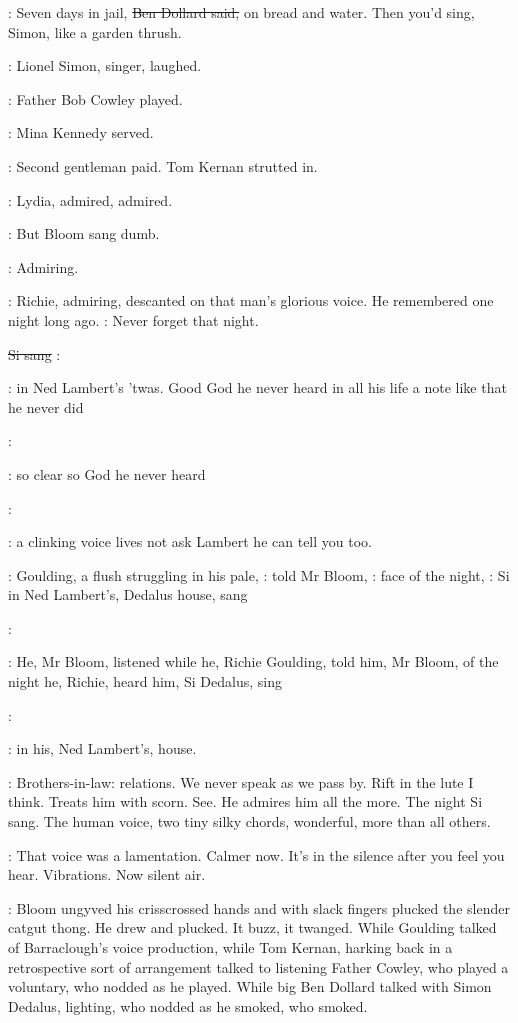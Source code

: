 \dollard:
Seven days in jail,
\sout{Ben Dollard said,}
on bread and water. Then you'd
sing, Simon, like a garden thrush.

:
Lionel Simon, singer, laughed.

:
Father Bob Cowley played.

:
Mina Kennedy served.

:
Second gentleman paid. Tom Kernan strutted in.

:
Lydia, admired, admired.

:
But Bloom sang dumb.

:
Admiring.

:
Richie, admiring, descanted on that man's glorious voice. He
remembered one night long ago.
\BloomInt:
Never forget that night.

\sout{Si sang}
\simon:

\BloomInt:
in Ned Lambert's 'twas.
Good God he never heard in all his
life a note like that he never did

\simon:

\BloomInt:
so clear so God he never heard

\simon:

\BloomInt:
a clinking voice lives
not ask Lambert he can tell you too.

:
Goulding, a flush struggling in his pale,
:
told Mr Bloom,
:
face of the night,
\goulding:
Si in Ned Lambert's, Dedalus house, sang

\simon:

:
He, Mr Bloom, listened while he, Richie Goulding, told him, Mr
Bloom, of the night he, Richie, heard him, Si Dedalus, sing

\simon:

:
in his, Ned Lambert's, house.

\BloomInt:
Brothers-in-law: relations. We never speak as we pass by. Rift in the
lute I think. Treats him with scorn.
See. He admires him all the more. The
night Si sang. The human voice, two tiny silky chords, wonderful, more
than all others.

\BloomInt:
That voice was a lamentation. Calmer now. It's in the silence after
you feel you hear. Vibrations. Now silent air.

:
Bloom ungyved his crisscrossed hands and with slack fingers plucked
the slender catgut thong. He drew and plucked. It buzz, it twanged. While
Goulding talked of Barraclough's voice production, while Tom Kernan,
harking back in a retrospective sort of arrangement talked to listening
Father Cowley, who played a voluntary, who nodded as he played. While
big Ben Dollard talked with Simon Dedalus, lighting,
who nodded as he
smoked, who smoked.

